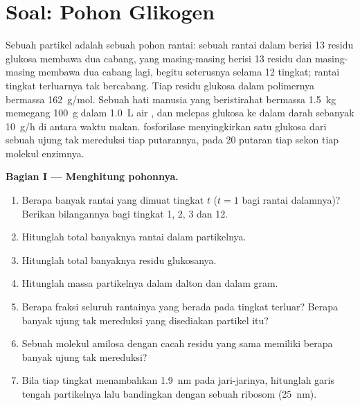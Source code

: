 \section{Soal: Pohon Glikogen}

\begin{problem}
\label{pb:b1:carbohydrates:1}
Sebuah partikel  adalah sebuah pohon rantai: sebuah rantai dalam
berisi \qty{13}{} residu glukosa membawa dua cabang, yang masing-masing
berisi \qty{13}{} residu dan masing-masing membawa dua cabang lagi,
begitu seterusnya selama \qty{12}{} tingkat; rantai tingkat terluarnya
tak bercabang. Tiap residu glukosa dalam polimernya bermassa
\qty{162}{g/mol}. Sebuah hati manusia yang beristirahat bermassa
\qty{1.5}{kg} memegang \qty{100}{g}  dalam \qty{1.0}{L} air
, dan melepas glukosa ke dalam darah sebanyak \qty{10}{g/h} di
antara waktu makan.  fosforilase menyingkirkan satu glukosa
dari sebuah ujung tak mereduksi tiap putarannya, pada \qty{20}{}
putaran tiap sekon tiap molekul enzimnya.

\medskip
\noindent\textbf{Bagian I --- Menghitung pohonnya.}
\begin{enumerate}
  \item Berapa banyak rantai yang dimuat tingkat $t$ ($t = 1$ bagi
        rantai dalamnya)? Berikan bilangannya bagi tingkat 1, 2, 3 dan
        12.
  \item Hitunglah total banyaknya rantai dalam partikelnya.
  \item Hitunglah total banyaknya residu glukosanya.
  \item Hitunglah massa partikelnya dalam dalton dan dalam gram.
  \item Berapa fraksi seluruh rantainya yang berada pada tingkat
        terluar? Berapa banyak ujung tak mereduksi yang disediakan
        partikel itu?
  \item Sebuah molekul amilosa dengan cacah residu yang sama memiliki
        berapa banyak ujung tak mereduksi?
  \item Bila tiap tingkat menambahkan \qty{1.9}{nm} pada jari-jarinya,
        hitunglah garis tengah partikelnya lalu bandingkan dengan
        sebuah ribosom
        (\qty{25}{nm}).
\end{enumerate}


\end{problem}
